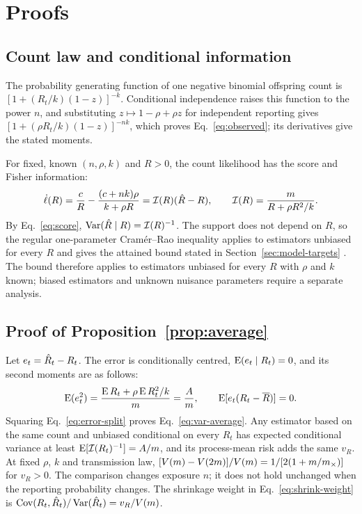 \clearpage
\appendix
{}
\renewcommand{\theequation}{\thesection.\arabic{equation}}

\section{Proofs}
\label{app:proofs}

\subsection{Count law and conditional information}
\label{app:model}

The probability generating function of one negative binomial offspring count is $[1+(R_t/k)(1-z)]^{-k}$. Conditional independence raises this function to the power $n$, and substituting $z\mapsto1-\rho+\rho z$ for independent reporting gives $[1+(\rho R_t/k)(1-z)]^{-nk}$, which proves Eq.~\eqref{eq:observed}; its derivatives give the stated moments.

For fixed, known $(n,\rho,k)$ and $R>0$, the count likelihood has the score and Fisher information:
\begin{equation}
 \dot\ell(R)=\frac{c}{R}-\frac{(c+nk)\rho}{k+\rho R}
 =\mathcal I(R)(\hat R-R),\qquad
 \mathcal I(R)=\frac{m}{R+\rho R^2/k}.
 \label{eq:score}
\end{equation}
By Eq.~\eqref{eq:score}, $\operatorname{Var}(\hat R\mid R)=\mathcal I(R)^{-1}$. The support does not depend on $R$, so the regular one-parameter Cram\'er--Rao inequality applies to estimators unbiased for every $R$ and gives the attained bound stated in Section~\ref{sec:model-targets} \citep{lehmann1998theory}. The bound therefore applies to estimators unbiased for every $R$ with $\rho$ and $k$ known; biased estimators and unknown nuisance parameters require a separate analysis.

\subsection{Proof of Proposition~\ref{prop:average}}
\label{app:prop1}

Let $e_t=\hat R_t-R_t$. The error is conditionally centred, $\operatorname{E}(e_t\mid R_t)=0$, and its second moments are as follows:
\begin{equation}
 \operatorname{E}(e_t^2)=\frac{\operatorname{E} R_t+\rho\operatorname{E} R_t^2/k}{m}=\frac{A}{m},
 \qquad \operatorname{E}[e_t(R_t-\overline{R})]=0.
\end{equation}
Squaring Eq.~\eqref{eq:error-split} proves Eq.~\eqref{eq:var-average}. Any estimator based on the same count and unbiased conditional on every $R_t$ has expected conditional variance at least $\operatorname{E}[\mathcal I(R_t)^{-1}]=A/m$, and its process-mean risk adds the same $v_R$. At fixed $\rho$, $k$ and transmission law, $[V(m)-V(2m)]/V(m)=1/[2(1+m/m_\times)]$ for $v_R>0$. The comparison changes exposure $n$; it does not hold unchanged when the reporting probability changes. The shrinkage weight in Eq.~\eqref{eq:shrink-weight} is $\operatorname{Cov}(R_t,\hat R_t)/\operatorname{Var}(\hat R_t)=v_R/V(m)$.

